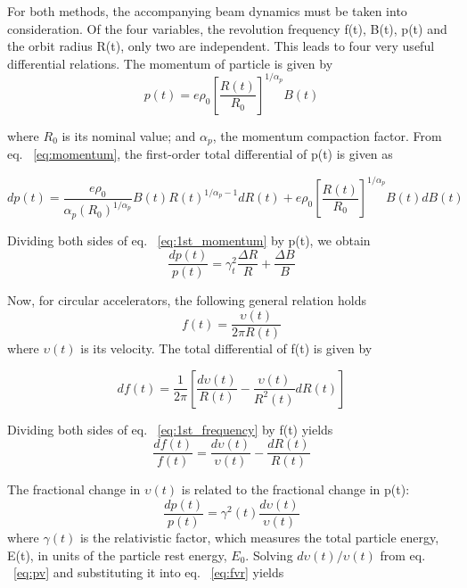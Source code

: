For both methods, the accompanying beam dynamics must be taken into consideration. Of the four variables, the revolution frequency f(t), B(t), p(t) and the orbit radius R(t), only two are independent.  This leads to four very useful differential relations. The momentum of particle is given by
\begin{equation}
\label{eq:momentum}
p(t)=e\rho_0 [\frac {R(t)}{R_0}]^{1/\alpha_p }B(t) 
\end{equation}

where $R_0$ is its nominal value; and $\alpha_p$, the momentum compaction factor. From eq. ~\ref{eq:momentum}, the first-order total differential of p(t) is given as

\begin{equation}
\label{eq:1st_momentum}
dp(t)=\frac{e\rho_0}{\alpha_p (R_0)^{1/\alpha_p}}B(t)R(t)^{1/\alpha_p-1}dR(t)+ e\rho_0 [\frac {R(t)}{R_0}]^{1/\alpha_p }B(t)dB(t) 
\end{equation}

Dividing both sides of eq. ~\ref{eq:1st_momentum} by p(t), we obtain
\begin{equation}
\label{eq:pRB}
\frac{dp(t)}{p(t)}={\gamma_t^2}\frac{\Delta{R}}{R}+\frac{\Delta{B}}{B} 
\end{equation}

Now, for circular accelerators, the following general relation holds
\begin{equation}
\label{eq:frequency}
f(t)=\frac{\upsilon(t)}{2\pi R(t)} 
\end{equation}
where $\upsilon(t)$ is its velocity. The total differential of f(t) is given by

\begin{equation}
\label{eq:1st_frequency}
df(t)=\frac{1}{2\pi}[\frac{d\upsilon(t)}{R(t)}- \frac{\upsilon(t)}{R^2(t)}dR(t)]
\end{equation}

Dividing both sides of eq. ~\ref{eq:1st_frequency} by f(t) yields
\begin{equation}
\label{eq:fvr}
\frac{df(t)}{f(t)}=\frac{d\upsilon(t)}{\upsilon(t)}- \frac{dR(t)}{R(t)}
\end{equation}

The fractional change in $\upsilon(t)$ is related to the fractional change in p(t):
\begin{equation}
\label{eq:pv}
\frac{dp(t)}{p(t)}=\gamma^2(t)\frac{d\upsilon(t)}{\upsilon(t)}
\end{equation}
where $\gamma(t)$  is the relativistic factor, which measures the total particle energy, E(t), in units of the particle rest energy, $E_0$. Solving $d\upsilon(t)/\upsilon(t)$ from eq. ~\ref{eq:pv} and substituting it into eq. ~\ref{eq:fvr} yields

